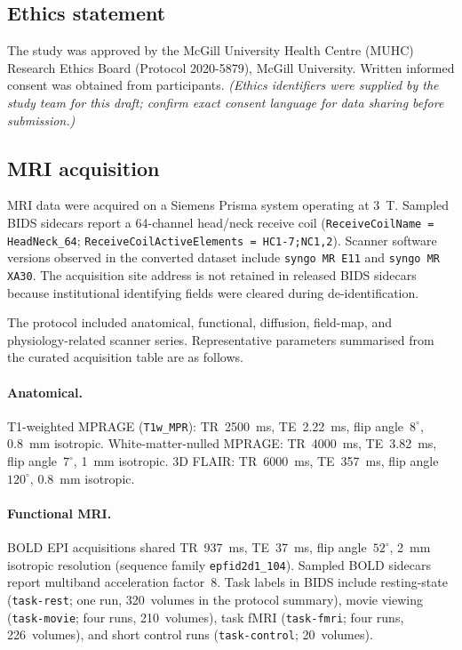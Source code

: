 \documentclass[11pt,letterpaper]{article}
\begin{document}
\subsection{Ethics statement}

The study was approved by the McGill University Health Centre (MUHC) Research
Ethics Board (Protocol 2020-5879), McGill University.
Written informed consent was obtained from participants.
\textit{(Ethics identifiers were supplied by the study team for this draft;
confirm exact consent language for data sharing before submission.)}

\subsection{MRI acquisition}

MRI data were acquired on a Siemens Prisma system operating at 3~T.
Sampled BIDS sidecars report a 64-channel head/neck receive coil
(\texttt{ReceiveCoilName = HeadNeck\_64};
\texttt{ReceiveCoilActiveElements = HC1-7;NC1,2}).
Scanner software versions observed in the converted dataset include
\texttt{syngo MR E11} and \texttt{syngo MR XA30}.
The acquisition site address is not retained in released BIDS sidecars because
institutional identifying fields were cleared during de-identification.

The protocol included anatomical, functional, diffusion, field-map, and
physiology-related scanner series. Representative parameters summarised from
the curated acquisition table are as follows.

\paragraph{Anatomical.}
T1-weighted MPRAGE (\texttt{T1w\_MPR}): TR~2500~ms, TE~2.22~ms, flip angle~$8^\circ$,
0.8~mm isotropic.
White-matter-nulled MPRAGE: TR~4000~ms, TE~3.82~ms, flip angle~$7^\circ$,
1~mm isotropic.
3D FLAIR: TR~6000~ms, TE~357~ms, flip angle~$120^\circ$, 0.8~mm isotropic.

\paragraph{Functional MRI.}
BOLD EPI acquisitions shared TR~937~ms, TE~37~ms, flip angle~$52^\circ$,
2~mm isotropic resolution (sequence family \texttt{epfid2d1\_104}).
Sampled BOLD sidecars report multiband acceleration factor~8.
Task labels in BIDS include resting-state (\texttt{task-rest}; one run,
320~volumes in the protocol summary), movie viewing (\texttt{task-movie};
four runs, 210~volumes), task fMRI (\texttt{task-fmri}; four runs,
226~volumes), and short control runs (\texttt{task-control}; 20~volumes).
\end{document}

